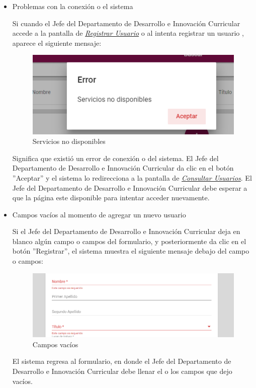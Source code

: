 \begin{itemize}
	\item Problemas con la conexión o el sistema
	
	Si cuando el Jefe del Departamento de Desarrollo e Innovación Curricular accede a la pantalla de \hyperlink{registrarUs-JDDIC}{\textit{Registrar Usuario}} o al intenta registrar un usuario , aparece el siguiente mensaje:
	
	\begin{figure}[H]
		\centering
		\includegraphics[width=0.4\linewidth]{images/SP5/MSGSN}
		\caption{Servicios no disponibles}
		\label{SND}
		
	\end{figure}
	
	Significa que existió un error de conexión o del sistema. El Jefe del Departamento de Desarrollo e Innovación Curricular da clic en el botón ''Aceptar'' y el sistema lo redirecciona  a la pantalla de \hyperlink{consultarUs-JDDIC}{\textit{Consultar Usuarios}}. El Jefe del Departamento de Desarrollo e Innovación Curricular debe esperar a que la página este disponible para intentar acceder nuevamente.
	
	\item Campos vacíos al momento de agregar un nuevo usuario
	
	Si el Jefe del Departamento de Desarrollo e Innovación Curricular deja en blanco algún campo o campos del formulario, y posteriormente da clic en el botón ''Registrar'', el sistema muestra el siguiente mensaje debajo del campo o campos:
	
	\begin{figure}[H]
		\centering
		\includegraphics[width=0.4\linewidth]{images/SP5/MSG44}
		\caption{Campos vacíos}
		\label{mensaje44-JDDIC}
	\end{figure}
	
	El sistema regresa al formulario, en donde el Jefe del Departamento de Desarrollo e Innovación Curricular debe llenar el o los campos que dejo vacíos.
	

\end{itemize}
